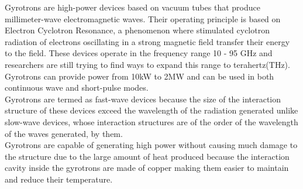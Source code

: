 \setcounter{page}{1}
\thispagestyle{empty}
Gyrotrons are high-power devices based on vacuum tubes that produce millimeter-wave electromagnetic waves. Their operating principle is based on Electron Cyclotron Resonance, a phenomenon where stimulated cyclotron radiation of electrons oscillating in a strong magnetic field transfer their energy to the field. These devices operate in the frequency range 10 - 95 GHz and researchers are still trying to find ways to expand this range to terahertz(THz). Gyrotrons can provide power from 10kW to 2MW and can be used in both continuous wave and short-pulse modes.\\

Gyrotrons are termed as fast-wave devices because the size of the interaction structure of these devices exceed the wavelength of the radiation generated unlike slow-wave devices, whose interaction structures are of the order of the wavelength of the waves generated, by them.\\

Gyrotrons are capable of generating high power without causing much damage to the structure due to the large amount of heat produced because the interaction cavity inside the gyrotrons are made of copper making them easier to maintain and reduce their temperature.
